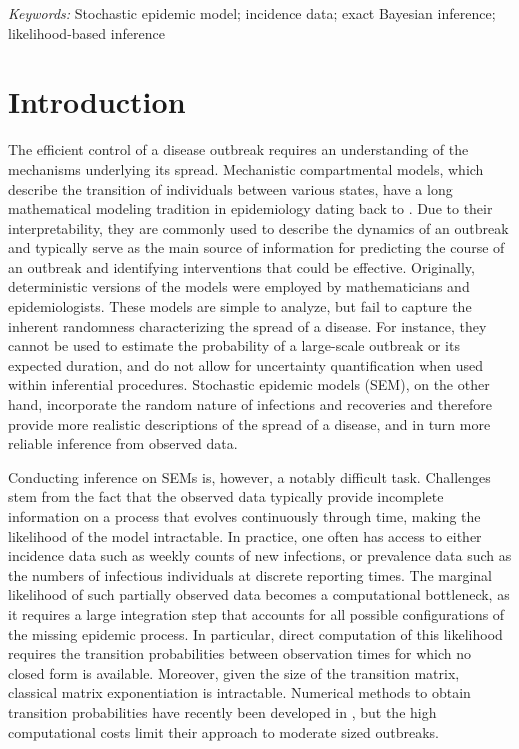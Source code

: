 \documentclass[12pt]{article}
\begin{document}
	\noindent%
	{\it Keywords:}  Stochastic epidemic model; incidence data; exact Bayesian inference; likelihood-based inference
	\vfill
	
	\newpage
	
	
	\section{Introduction}
	\label{sec:intro}
	
	The efficient control of a disease outbreak requires an understanding of the mechanisms underlying its spread. Mechanistic compartmental models, which describe the transition of individuals between various states, have a long mathematical modeling tradition in epidemiology dating back to \cite{Kermack.1927}. Due to their interpretability, they are commonly used to describe the dynamics of an outbreak and typically serve as the main source of information for predicting the course of an outbreak and identifying interventions that could be effective. Originally, deterministic versions of the models were employed by mathematicians and epidemiologists. These models are simple to analyze, but fail to capture the inherent randomness characterizing the spread of a disease. For instance, they cannot be used to estimate the probability of a large-scale outbreak or its expected duration, and do not allow for uncertainty quantification when used within inferential procedures. Stochastic epidemic models (SEM), on the other hand, incorporate the random nature of infections and recoveries and therefore provide more realistic descriptions of the spread of a disease, and in turn more reliable inference from observed data.
	
	Conducting inference on SEMs is, however, a notably difficult task. Challenges stem from the fact that the observed data typically provide incomplete information on a process that evolves continuously through time, making the likelihood of the model intractable. %
	In practice, one often has access to either incidence data such as weekly counts of new infections, or prevalence data such as the numbers of infectious individuals at discrete reporting times. The marginal likelihood of such partially observed data becomes a computational bottleneck, as it requires a large integration step that accounts for all possible configurations of the missing epidemic process. In particular, direct computation of this likelihood requires the transition probabilities between observation times for which no closed form is available. Moreover, given the size of the transition matrix, classical matrix exponentiation is intractable.
	Numerical methods to obtain transition probabilities have recently been developed in \cite{Ho.2018}, but the high computational costs limit their approach to moderate sized outbreaks.
	
\end{document}
